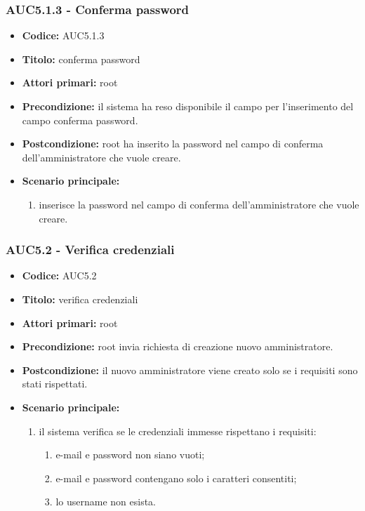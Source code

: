 \documentclass[casi-duso]{subfiles}
\begin{document}
\subsubsection{AUC5.1.3 - Conferma password}%
\label{subsub:AUC5.1.3}
\begin{itemize}
  \item \textbf{Codice:} AUC5.1.3
  \item \textbf{Titolo:} conferma password
  \item \textbf{Attori primari:} root
  \item \textbf{Precondizione:} il sistema ha reso disponibile il campo per l'inserimento del campo conferma password.
  \item \textbf{Postcondizione:} root ha inserito la password nel campo di conferma dell'amministratore che vuole creare.
  \item \textbf{Scenario principale:}
  \begin{enumerate}
    \item {} inserisce la password nel campo di conferma dell'amministratore che vuole creare.
  \end{enumerate}
\end{itemize}

\subsubsection{AUC5.2 - Verifica credenziali}%
\label{subsub:AUC5.2}
\begin{itemize}
  \item \textbf{Codice:} AUC5.2
  \item \textbf{Titolo:} verifica credenziali
  \item \textbf{Attori primari:} root
  \item \textbf{Precondizione:} root invia richiesta di creazione nuovo amministratore.
  \item \textbf{Postcondizione:} il nuovo amministratore viene creato solo se i requisiti sono stati rispettati.
  \item \textbf{Scenario principale:}
  \begin{enumerate}
    \item il sistema verifica se le credenziali immesse rispettano i requisiti:
    \begin{enumerate}
      \item e-mail e password non siano vuoti;
      \item e-mail e password contengano solo i caratteri consentiti;
      \item lo username non esista.
    \end{enumerate}
  \end{enumerate}
\end{itemize}
\end{document}
